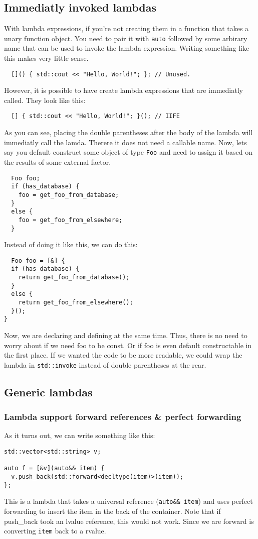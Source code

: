 \documentclass{report}
\begin{document}
\subsection{Immediatly invoked lambdas}
With lambda expressions, if you're not creating them in a function that takes a unary function object. You need to pair it with \texttt{auto} followed by some arbirary name that can be used to invoke the lambda expression. Writing something like this makes very little sense.
\begin{verbatim}
  []() { std::cout << "Hello, World!"; }; // Unused. 
\end{verbatim}
However, it is possible to have create lambda expressions that are immediatly called. They look like this:
\begin{verbatim}
  [] { std::cout << "Hello, World!"; }(); // IIFE
\end{verbatim}
As you can see, placing the double parentheses after the body of the lambda will immediatly call the lamda. Therere it does not need a callable name.
\bigbreak \noindent
Now, lets say you default construct some object of type \texttt{Foo} and need to assign it based on the results of some external factor.
\begin{verbatim}
  Foo foo;
  if (has_database) {
    foo = get_foo_from_database;
  }
  else {
    foo = get_foo_from_elsewhere;
  }
\end{verbatim}
Instead of doing it like this, we can do this:
\begin{verbatim}
  Foo foo = [&] {
  if (has_database) {
    return get_foo_from_database();
  }
  else {
    return get_foo_from_elsewhere();
  }();
}
\end{verbatim}
Now, we are declaring and defining at the same time. Thus, there is no need to worry about if we need foo to be const. Or if foo is even default constructable in the first place. \bigbreak \noindent If we wanted the code to be more readable, we could wrap the lambda in \texttt{std::invoke} instead of double parentheses at the rear.
\subsection{Generic lambdas}
\subsubsection*{Lambda support forward references \& perfect forwarding}
As it turns out, we can write something like this:
\begin{verbatim}
std::vector<std::string> v;

auto f = [&v](auto&& item) {
  v.push_back(std::forward<decltype(item)>(item));
};
\end{verbatim}
This is a lambda that takes a universal reference (\texttt{auto\&\& item}) and uses perfect forwarding to insert the item in the back of the container. Note that if push\_back took an lvalue reference, this would not work. Since we are forward is converting \texttt{item} back to a rvalue.
\end{document}
